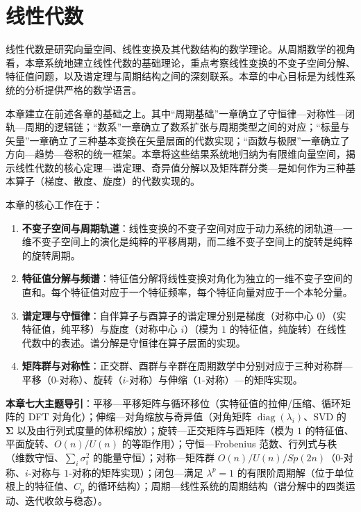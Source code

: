 \chapter{线性代数}
\label{chap:linear_algebra}

\begin{remark}[本章的定位]\label{rem:linear_algebra_chapter_positioning}
线性代数是研究向量空间、线性变换及其代数结构的数学理论。从周期数学的视角看，本章系统地建立线性代数的基础理论，重点考察线性变换的不变子空间分解、特征值问题，以及谱定理与周期结构之间的深刻联系。本章的中心目标是为线性系统的分析提供严格的数学语言。

本章建立在前述各章的基础之上。其中“周期基础”一章确立了守恒律---对称性---闭轨---周期的逻辑链；“数系”一章确立了数系扩张与周期类型之间的对应；“标量与矢量”一章确立了三种基本变换在矢量层面的代数实现；“函数与极限”一章确立了方向---趋势---卷积的统一框架。本章将这些结果系统地归纳为有限维向量空间，揭示线性代数的核心定理---谱定理、奇异值分解以及矩阵群分类---是如何作为三种基本算子（梯度、散度、旋度）的代数实现的。

本章的核心工作在于：
\begin{enumerate}[label=(\arabic*)]
    \item \textbf{不变子空间与周期轨道}：线性变换的不变子空间对应于动力系统的闭轨道---一维不变子空间上的演化是纯粹的平移周期，而二维不变子空间上的旋转是纯粹的旋转周期。
    \item \textbf{特征值分解与频谱}：特征值分解将线性变换对角化为独立的一维不变子空间的直和。每个特征值对应于一个特征频率，每个特征向量对应于一个本轮分量。
    \item \textbf{谱定理与守恒律}：自伴算子与酉算子的谱定理分别是梯度（对称中心 $0$）（实特征值，纯平移）与旋度（对称中心 $i$）（模为 $1$ 的特征值，纯旋转）在线性代数中的表述。谱分解是守恒律在算子层面的实现。
    \item \textbf{矩阵群与对称性}：正交群、酉群与辛群在周期数学中分别对应于三种对称群---平移（$0$-对称）、旋转（$i$-对称）与伸缩（$1$-对称）---的矩阵实现。
\end{enumerate}

\textbf{本章七大主题导引}：平移---平移矩阵与循环移位（实特征值的拉伸/压缩、循环矩阵的 DFT 对角化）；伸缩---对角缩放与奇异值（对角矩阵 $\operatorname{diag}(\lambda_i)$、SVD 的 $\boldsymbol{\Sigma}$ 以及由行列式度量的体积缩放）；旋转---正交矩阵与酉矩阵（模为 $1$ 的特征值、平面旋转、$O(n)/U(n)$ 的等距作用）；守恒---Frobenius 范数、行列式与秩（维数守恒、$\sum_i \sigma_i^2$ 的能量守恒）；对称---矩阵群 $O(n)/U(n)/Sp(2n)$（$0$-对称、$i$-对称与 $1$-对称的矩阵实现）；闭包---满足 $\lambda^p = 1$ 的有限阶周期解（位于单位根上的特征值、$C_p$ 的循环结构）；周期---线性系统的周期结构（谱分解中的四类运动、迭代收敛与稳态）。
\end{remark}

